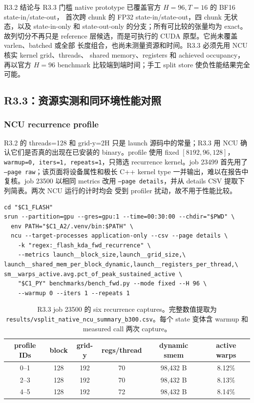 \documentclass[11pt,a4paper,fontset=none]{ctexart}
\newcommand{\code}[1]{\texttt{#1}}
\begin{document}
\begin{record}{R3.2 结论与 R3.3 门槛}
native prototype 已覆盖官方 \(H=96,T=16\) 的 BF16 state-in/state-out，
首次跨 chunk 的 FP32 state-in/state-out，四 chunk 无状态，以及 state-in-only
和 state-out-only 的分支；所有可比较的张量均为 exact。故列切分不再只是
reference 层候选，而是可执行的 CUDA 原型。它尚未覆盖 varlen、batched 或全部
长度组合，也尚未测量资源和时间。R3.3 必须先用 NCU 核实 kernel grid、threads、
shared memory、registers 和 achieved occupancy，再以官方 \(H=96\) benchmark
比较端到端时间；手工 split store 使负性能结果完全可能。
\end{record}

\subsection{R3.3：资源实测和同环境性能对照}

\subsubsection{NCU recurrence profile}

R3.2 的 threads=128 和 grid-y=2H 只是 launch 源码中的常量；R3.3 用 NCU
确认它们是否真的出现在已安装的 binary。profile 使用 fixed
\([8192,96,128]\)，\code{warmup=0, iters=1, repeats=1}，只筛选 recurrence
kernel。job 23499 首先用了 \code{--page raw}；该页面将设备属性和极长 C++
kernel type 一并输出，难以在报告中复核。job 23500 以相同 metrics 改用
\code{--page details}，并从 details CSV 提取下列简表。两次 NCU 运行的计时均会
受到 profiler 扰动，故不用于性能比较。

\begin{lstlisting}
cd "$C1_FLASH"
srun --partition=gpu --gres=gpu:1 --time=00:30:00 --chdir="$PWD" \
  env PATH="$C1_A2/.venv/bin:$PATH" \
  ncu --target-processes application-only --csv --page details \
    -k "regex:_flash_kda_fwd_recurrence" \
    --metrics launch__block_size,launch__grid_size,\
launch__shared_mem_per_block_dynamic,launch__registers_per_thread,\
sm__warps_active.avg.pct_of_peak_sustained_active \
    "$C1_PY" benchmarks/bench_fwd.py --mode fixed --H 96 \
    --warmup 0 --iters 1 --repeats 1
\end{lstlisting}

\begin{table}[htbp]
\centering
\small
\begin{tabular}{c c c c c c}
\toprule
profile IDs & block & grid-y & regs/thread & dynamic smem & active warps \\
\midrule
0--1 & 128 & 192 & 70 & 98,432 B & 8.12\% \\
2--3 & 128 & 192 & 70 & 98,432 B & 8.13\% \\
4--5 & 128 & 192 & 72 & 98,432 B & 8.14\% \\
\bottomrule
\end{tabular}
\caption{R3.3 job 23500 的 six recurrence captures。完整数值提取为
\code{results/vsplit\_native\_ncu\_summary\_b300.csv}。每个 state 变体含
warmup 和 measured call 两次 capture。}
\end{table}
\end{document}
